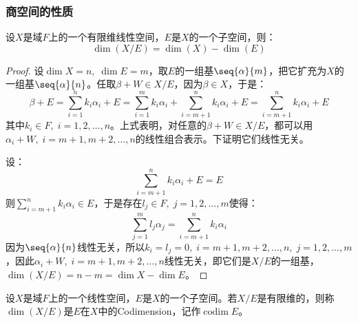 \subsubsection{商空间的性质}
\begin{theorem}\label{theo:QuotientDim}
	设$X$是域$F$上的一个有限维线性空间，$E$是$X$的一个子空间，则：
	\begin{equation*}
		\dim(X/E)=\dim(X)-\dim(E)
	\end{equation*}
\end{theorem}
\begin{proof}
	设$\dim X=n,\;\dim E=m$，取$E$的一组基$\seq{\alpha}{m}$，把它扩充为$X$的一组基$\seq{\alpha}{n}$。任取$\beta+W\in X/E$，因为$\beta\in X$，于是：
	\begin{equation*}
		\beta+E=\sum_{i=1}^{n}k_i\alpha_i+E=\sum_{i=1}^{m}k_i\alpha_i+\sum_{i=m+1}^{n}k_i\alpha_i+E=\sum_{i=m+1}^{n}k_i\alpha_i+E
	\end{equation*}
	其中$k_i\in F,\;i=1,2,\dots,n$。上式表明，对任意的$\beta+W\in X/E$，都可以用$\alpha_i+W,\;i=m+1,m+2,\dots,n$的线性组合表示。下证明它们线性无关。\par
	设：
	\begin{equation*}
		\sum_{i=m+1}^{n}k_i\alpha_i+E=E
	\end{equation*}
	则$\sum\limits_{i=m+1}^{n}k_i\alpha_i\in E$，于是存在$l_j\in F,\;j=1,2,\dots,m$使得：
	\begin{equation*}
		\sum_{j=1}^{m}l_j\alpha_j=\sum_{i=m+1}^{n}k_i\alpha_i
	\end{equation*}
	因为$\seq{\alpha}{n}$线性无关，所以$k_i=l_j=0,\;i=m+1,m+2,\dots,n,\;j=1,2,\dots,m$，因此$\alpha_i+W,\;i=m+1,m+2,\dots,n$线性无关，即它们是$X/E$的一组基，$\dim(X/E)=n-m=\dim X-\dim E$。
\end{proof}
\begin{definition}
	设$X$是域$F$上的一个线性空间，$E$是$X$的一个子空间。若$X/E$是有限维的，则称$\dim(X/E)$是$E$在$X$中的\gls{Codimension}，记作$\operatorname{codim}E$。
\end{definition}
